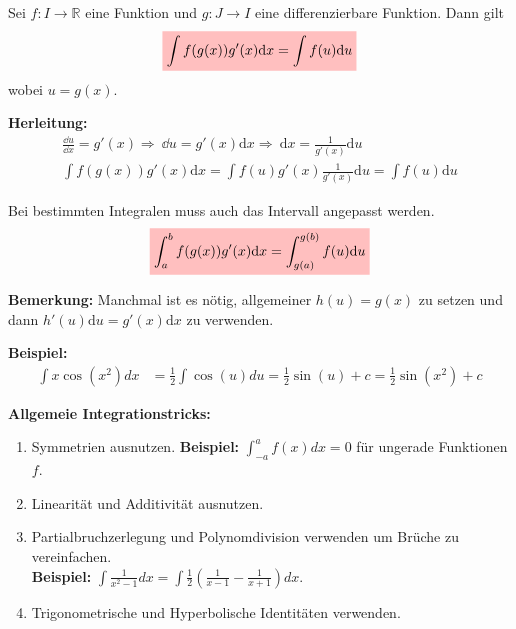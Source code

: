 \documentclass[12pt]{article}
\newcommand{\dx}{\mathrm{d}x}
\newcommand{\du}{\mathrm{d}u}
\newcommand{\Follows}{\Longrightarrow\ }
\newcommand{\R}{\mathbb{R}} %
\newenvironment{definition}[2][Definition]{\begin{trivlist}
        \item[\hskip \labelsep {\bfseries #1}\hskip \labelsep {\bfseries #2.}]}{\flushright{$\square$}\end{trivlist}}
\begin{document}
\begin{definition}{[Substitution]}
    Sei $f: I \to \R$ eine Funktion und $g: J \to I$ eine differenzierbare Funktion. Dann gilt
    \begin{align}
        \colorbox{pink}{\mathstrut$\displaystyle\int f(g(x))g'(x)\dx=\displaystyle\int f(u)\du$}
    \end{align}
    wobei $u=g(x)$.

    \textbf{Herleitung:}
    \begin{align*}
        \frac{\dd{u}}{\dd{x}}=g'(x) \Follows \dd{u}=g'(x)\dx \Follows \dx=\frac{1}{g'(x)}\du \\
        \int f(g(x))g'(x)\dx=\int f(u)g'(x)\frac{1}{g'(x)}\du=\int f(u)\du
    \end{align*}

    Bei bestimmten Integralen muss auch das Intervall angepasst werden.
    \begin{align}
        \colorbox{pink}{\mathstrut$\displaystyle\int_{a}^{b}f(g(x))g'(x)\dx=\displaystyle\int_{g(a)}^{g(b)}f(u)\du$}
    \end{align}

    \textbf{Bemerkung:} Manchmal ist es nötig, allgemeiner $h(u)=g(x)$ zu setzen und dann $h'(u)\du=g'(x)\dx$ zu verwenden.

    \textbf{Beispiel:}
    \begin{align*}
        \displaystyle\int x\cos(x^2)dx & =\frac{1}{2}\displaystyle\int \cos(u)du=\frac{1}{2}\sin(u)+c=\frac{1}{2}\sin(x^2)+c
    \end{align*}
\end{definition}

\textbf{Allgemeie Integrationstricks:}
\begin{enumerate}
    \item Symmetrien ausnutzen. \textbf{Beispiel:} $\displaystyle\int_{-a}^{a}f(x)dx=0$ für ungerade Funktionen $f$.
    \item Linearität und Additivität ausnutzen.
    \item Partialbruchzerlegung und Polynomdivision verwenden um Brüche zu vereinfachen. \\[5pt]\textbf{Beispiel:} $\displaystyle\int \frac{1}{x^2-1}dx=\displaystyle\int \frac{1}{2}\left(\frac{1}{x-1}-\frac{1}{x+1}\right)dx$.
    \item Trigonometrische und Hyperbolische Identitäten verwenden.
\end{enumerate}
\end{document}
